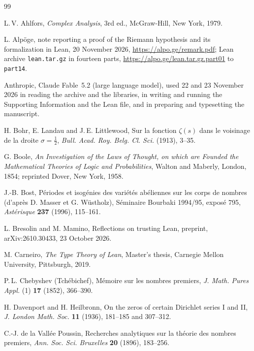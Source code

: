 \documentclass[11pt]{article}
\theoremstyle{definition}
\theoremstyle{remark}
\begin{document}
\begin{thebibliography}{99}\small

 L.\,V. Ahlfors, \emph{Complex Analysis}, 3rd ed., McGraw-Hill, New York, 1979.

 L. Alp\"oge, note reporting a proof of the Riemann hypothesis and its formalization in Lean, 20 November 2026, \url{https://alpo.ge/remark.pdf}; Lean archive \nolinkurl{lean.tar.gz} in fourteen parts, \url{https://alpo.ge/lean.tar.gz.part01} to \nolinkurl{part14}.

 Anthropic, Claude Fable~5.2 (large language model), used 22 and 23 November 2026 in reading the archive and the libraries, in writing and running the Supporting Information and the Lean file, and in preparing and typesetting the manuscript.

 H. Bohr, E. Landau and J.\,E. Littlewood, Sur la fonction $\zeta(s)$ dans le voisinage de la droite $\sigma=\tfrac12$, \emph{Bull. Acad. Roy. Belg. Cl. Sci.} (1913), 3--35.

 G. Boole, \emph{An Investigation of the Laws of Thought, on which are Founded the Mathematical Theories of Logic and Probabilities}, Walton and Maberly, London, 1854; reprinted Dover, New York, 1958.

 J.-B. Bost, P\'eriodes et isog\'enies des vari\'et\'es ab\'eliennes sur les corps de nombres (d'apr\`es D. Masser et G. W\"ustholz), S\'eminaire Bourbaki 1994/95, expos\'e 795, \emph{Ast\'erisque} \textbf{237} (1996), 115--161.

 L. Bresolin and M. Mamino, Reflections on trusting Lean, preprint, arXiv:2610.30433, 23 October 2026.

 M. Carneiro, \emph{The Type Theory of Lean}, Master's thesis, Carnegie Mellon University, Pittsburgh, 2019.

 P.\,L. Chebyshev (Tch\'ebichef), M\'emoire sur les nombres premiers, \emph{J. Math. Pures Appl.} (1) \textbf{17} (1852), 366--390.

 H. Davenport and H. Heilbronn, On the zeros of certain Dirichlet series I and II, \emph{J. London Math. Soc.} \textbf{11} (1936), 181--185 and 307--312.

 C.-J. de la Vall\'ee Poussin, Recherches analytiques sur la th\'eorie des nombres premiers, \emph{Ann. Soc. Sci. Bruxelles} \textbf{20} (1896), 183--256.


\end{thebibliography}
\end{document}
